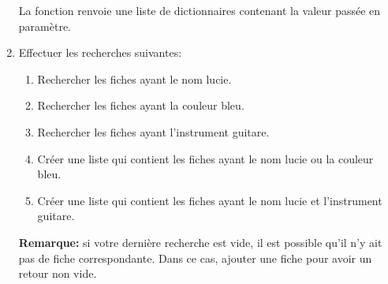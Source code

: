 \documentclass[11pt,a4paper]{article}
\begin{document}
\begin{enumerate}
La fonction renvoie une liste de dictionnaires contenant la valeur passée en paramètre.

\item Effectuer les recherches suivantes:
\begin{enumerate}
\item Rechercher les fiches ayant le nom \textsf{lucie}.
\item Rechercher les fiches ayant la couleur \textsf{bleu}.
\item Rechercher les fiches ayant l'instrument \textsf{guitare}.
\item Créer une liste qui contient les fiches ayant le nom \textsf{lucie} ou la couleur \textsf{bleu}.
\item Créer une liste qui contient les fiches ayant le nom \textsf{lucie} et l'instrument \textsf{guitare}.
\end{enumerate}

\textbf{Remarque:} si votre dernière recherche est vide, il est possible qu'il n'y ait pas de fiche correspondante. Dans ce cas, ajouter une fiche pour avoir un retour non vide.
\end{enumerate}
\end{document}
